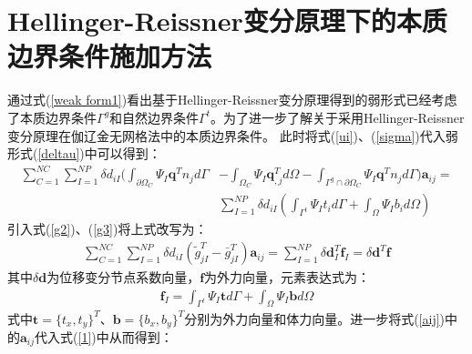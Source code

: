 \section{Hellinger-Reissner变分原理下的本质边界条件施加方法}
通过式(\ref{weak form1})看出基于Hellinger-Reissner变分原理得到的弱形式已经考虑了本质边界条件$\Gamma^g$和自然边界条件$\Gamma^t$。为了进一步了解关于采用Hellinger-Reissner变分原理在伽辽金无网格法中的本质边界条件。
此时将式(\ref{ui})、(\ref{sigma})代入弱形式(\ref{deltau})中可以得到：
\begin{equation}
\begin{split}
\sum_{C=1}^{N\!C}\sum_{I=1}^{N\!P}\delta d_{iI}(\int_{\partial\Omega_C}\Psi_I\pmb{q}^Tn_jd\Gamma&-\int_{\Omega_C}\Psi_I\pmb{q}_{,j}^Td\Omega-\int_{\Gamma^g\cap\partial\Omega_C}\Psi_I\pmb{q}^Tn_jd\Gamma)\pmb{a}_{ij}=\\
&\sum_{I=1}^{N\!P}\delta d_{iI}(\int_{\Gamma^t}\Psi_It_id\Gamma+\int_{\Omega}\Psi_Ib_id\Omega)
\end{split}
\end{equation}
引入式(\ref{g2})、(\ref{g3})将上式改写为：
\begin{equation}\label{1}
\begin{split}
    \sum_{C=1}^{N\!C}\sum_{I=1}^{N\!P}\delta d_{iI}(\tilde{g}_{jI}^T-\bar{g}_{jI}^T)\pmb{a}_{ij}=\sum_{I=1}^{N\!P}\delta\pmb{d}_I^T\pmb{f}_I=\delta\pmb{d}^T\pmb{f}
\end{split}
\end{equation}
其中$\delta\pmb{d}$为位移变分节点系数向量，$\pmb{f}$为外力向量，元素表达式为：
\begin{equation}
\begin{split}
    \pmb{f}_I=\int_{\Gamma^t}\Psi_I\pmb{t}d\Gamma+\int_{\Omega}\Psi_I\pmb{b}d\Omega
\end{split}
\end{equation}
式中$\pmb{t}=\{t_x,t_y\}^T\text{、}\pmb{b}=\{b_x,b_y\}^T$分别为外力向量和体力向量。进一步将式(\ref{aij})中的$\pmb{a}_{ij}$代入式(\ref{1})中从而得到：
